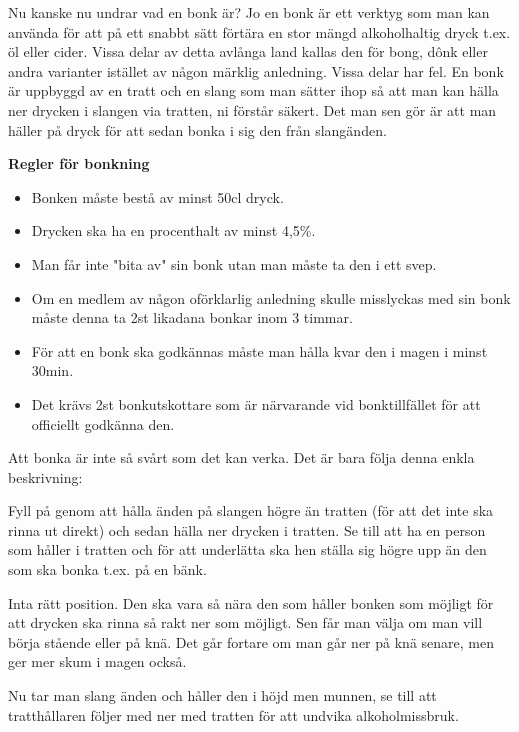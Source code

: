 
Nu kanske nu undrar vad en bonk är? Jo en bonk är ett verktyg som man kan använda för att på ett snabbt sätt förtära en stor mängd alkoholhaltig dryck t.ex. öl eller cider. Vissa delar av detta avlånga land kallas den för bong, dônk eller andra varianter istället av någon märklig anledning. Vissa delar har fel. En bonk är uppbyggd av en tratt och en slang som man sätter ihop så att man kan hälla ner drycken i slangen via tratten, ni förstår säkert. Det man sen gör är att man häller på dryck för att sedan bonka i sig den från slangänden. 

\textbf{Regler för bonkning}

\begin{itemize}
    \item Bonken måste bestå av minst 50cl dryck.
    \item Drycken ska ha en procenthalt av minst 4,5\%.
    \item Man får inte "bita av" sin bonk utan man måste ta den i ett svep.
    \item Om en medlem av någon oförklarlig anledning skulle misslyckas med sin bonk måste denna ta 2st likadana bonkar inom 3 timmar.
    \item För att en bonk ska godkännas måste man hålla kvar den i magen i minst 30min.
    \item Det krävs 2st bonkutskottare som är närvarande vid bonktillfället för att officiellt godkänna den.
\end{itemize}\newpage


Att bonka är inte så svårt som det kan verka. Det är bara följa denna enkla beskrivning:

Fyll på genom att hålla änden på slangen högre än tratten (för att det inte ska rinna ut direkt) och sedan hälla ner drycken i tratten. Se till att ha en person som håller i tratten och för att underlätta ska hen ställa sig högre upp än den som ska bonka t.ex. på en bänk.

Inta rätt position. Den ska vara så nära den som håller bonken som möjligt för att drycken ska rinna så rakt ner som möjligt. Sen får man välja om man vill börja stående eller på knä. Det går fortare om man går ner på knä senare, men ger mer skum i magen också.

Nu tar man slang änden och håller den i höjd men munnen, se till att tratthållaren följer med ner med tratten för att undvika alkoholmissbruk.

